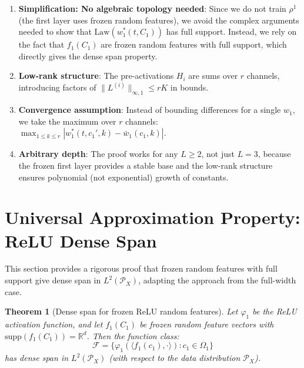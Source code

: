 \documentclass[11pt]{article}
\newcommand{\1}{\mathbbm{1}}
\newtheorem{theorem}{Theorem}
\begin{document}
\begin{enumerate}
\item \textbf{Simplification: No algebraic topology needed}: Since we do not train $\rho^1$ (the first layer uses frozen random features), we avoid the complex arguments needed to show that $\text{Law}(w_1^*(t,C_1))$ has full support. Instead, we rely on the fact that $f_1(C_1)$ are frozen random features with full support, which directly gives the dense span property.

\item \textbf{Low-rank structure}: The pre-activations $H_i$ are sums over $r$ channels, introducing factors of $\|L^{(i)}\|_{\infty,1}\le rK$ in bounds.

\item \textbf{Convergence assumption}: Instead of bounding differences for a single $w_1$, we take the maximum over $r$ channels: $\max_{1\le k\le r}|w_1^*(t,c_1',k)-\bar{w}_1(c_1,k)|$.

\item \textbf{Arbitrary depth}: The proof works for any $L \ge 2$, not just $L=3$, because the frozen first layer provides a stable base and the low-rank structure ensures polynomial (not exponential) growth of constants.
\end{enumerate}

\section{Universal Approximation Property: ReLU Dense Span}
\label{sec:relu-dense-span}

This section provides a rigorous proof that frozen random features with full support give dense span in $L^2(\mathcal{P}_X)$, adapting the approach from the full-width case.

\begin{theorem}[Dense span for frozen ReLU random features]
\label{thm:relu-dense-span}
Let $\varphi_1$ be the ReLU activation function, and let $f_1(C_1)$ be frozen random feature vectors with $\text{supp}(f_1(C_1)) = \mathbb{R}^d$. Then the function class:
\[
\mathcal{F} = \{\varphi_1(\langle f_1(c_1), \cdot\rangle) : c_1 \in \Omega_1\}
\]
has dense span in $L^2(\mathcal{P}_X)$ (with respect to the data distribution $\mathcal{P}_X$).
\end{theorem}
\end{document}

